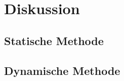 \section{Diskussion}
\label{sec:Diskussion}

\subsection{Statische Methode}

\subsection{Dynamische Methode}